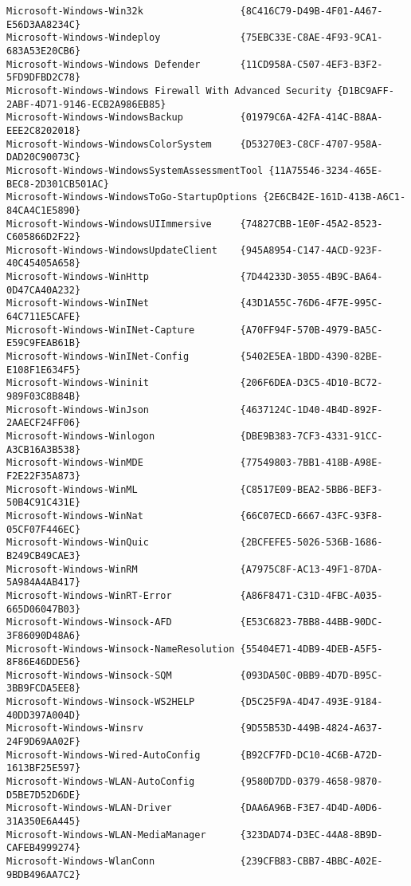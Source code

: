 \documentclass{report}
\begin{document}
\begin{lstlisting}[breaklines=true,basicstyle=\tiny]
Microsoft-Windows-Win32k                 {8C416C79-D49B-4F01-A467-E56D3AA8234C}
Microsoft-Windows-Windeploy              {75EBC33E-C8AE-4F93-9CA1-683A53E20CB6}
Microsoft-Windows-Windows Defender       {11CD958A-C507-4EF3-B3F2-5FD9DFBD2C78}
Microsoft-Windows-Windows Firewall With Advanced Security {D1BC9AFF-2ABF-4D71-9146-ECB2A986EB85}
Microsoft-Windows-WindowsBackup          {01979C6A-42FA-414C-B8AA-EEE2C8202018}
Microsoft-Windows-WindowsColorSystem     {D53270E3-C8CF-4707-958A-DAD20C90073C}
Microsoft-Windows-WindowsSystemAssessmentTool {11A75546-3234-465E-BEC8-2D301CB501AC}
Microsoft-Windows-WindowsToGo-StartupOptions {2E6CB42E-161D-413B-A6C1-84CA4C1E5890}
Microsoft-Windows-WindowsUIImmersive     {74827CBB-1E0F-45A2-8523-C605866D2F22}
Microsoft-Windows-WindowsUpdateClient    {945A8954-C147-4ACD-923F-40C45405A658}
Microsoft-Windows-WinHttp                {7D44233D-3055-4B9C-BA64-0D47CA40A232}
Microsoft-Windows-WinINet                {43D1A55C-76D6-4F7E-995C-64C711E5CAFE}
Microsoft-Windows-WinINet-Capture        {A70FF94F-570B-4979-BA5C-E59C9FEAB61B}
Microsoft-Windows-WinINet-Config         {5402E5EA-1BDD-4390-82BE-E108F1E634F5}
Microsoft-Windows-Wininit                {206F6DEA-D3C5-4D10-BC72-989F03C8B84B}
Microsoft-Windows-WinJson                {4637124C-1D40-4B4D-892F-2AAECF24FF06}
Microsoft-Windows-Winlogon               {DBE9B383-7CF3-4331-91CC-A3CB16A3B538}
Microsoft-Windows-WinMDE                 {77549803-7BB1-418B-A98E-F2E22F35A873}
Microsoft-Windows-WinML                  {C8517E09-BEA2-5BB6-BEF3-50B4C91C431E}
Microsoft-Windows-WinNat                 {66C07ECD-6667-43FC-93F8-05CF07F446EC}
Microsoft-Windows-WinQuic                {2BCFEFE5-5026-536B-1686-B249CB49CAE3}
Microsoft-Windows-WinRM                  {A7975C8F-AC13-49F1-87DA-5A984A4AB417}
Microsoft-Windows-WinRT-Error            {A86F8471-C31D-4FBC-A035-665D06047B03}
Microsoft-Windows-Winsock-AFD            {E53C6823-7BB8-44BB-90DC-3F86090D48A6}
Microsoft-Windows-Winsock-NameResolution {55404E71-4DB9-4DEB-A5F5-8F86E46DDE56}
Microsoft-Windows-Winsock-SQM            {093DA50C-0BB9-4D7D-B95C-3BB9FCDA5EE8}
Microsoft-Windows-Winsock-WS2HELP        {D5C25F9A-4D47-493E-9184-40DD397A004D}
Microsoft-Windows-Winsrv                 {9D55B53D-449B-4824-A637-24F9D69AA02F}
Microsoft-Windows-Wired-AutoConfig       {B92CF7FD-DC10-4C6B-A72D-1613BF25E597}
Microsoft-Windows-WLAN-AutoConfig        {9580D7DD-0379-4658-9870-D5BE7D52D6DE}
Microsoft-Windows-WLAN-Driver            {DAA6A96B-F3E7-4D4D-A0D6-31A350E6A445}
Microsoft-Windows-WLAN-MediaManager      {323DAD74-D3EC-44A8-8B9D-CAFEB4999274}
Microsoft-Windows-WlanConn               {239CFB83-CBB7-4BBC-A02E-9BDB496AA7C2}

\end{lstlisting}
\end{document}
